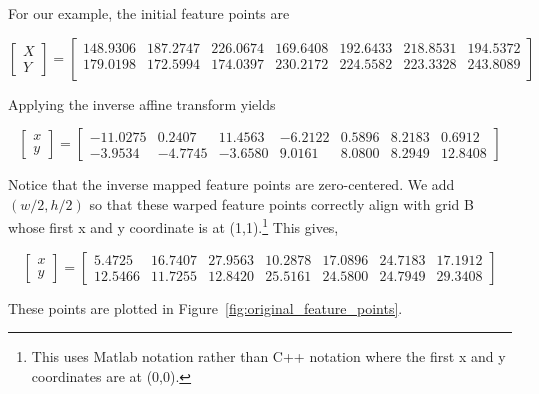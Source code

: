 For our example, the initial feature points are 

\begin{equation*}
\left[\begin{array}{ccc}
X  
\\ 
Y
\end{array}
\right]=
\left[
\begin{array}{cccccccc}
148.9306 & 187.2747 & 226.0674 & 169.6408 & 192.6433 & 218.8531 & 194.5372\\
179.0198 & 172.5994 & 174.0397 & 230.2172 & 224.5582 & 223.3328 & 243.8089\\
\end{array}
\right]
\end{equation*}

Applying the inverse affine transform yields

\begin{equation*}
\left[\begin{array}{ccc}
x  
\\ 
y
\end{array}
\right]=
\left[
\begin{array}{rrrrrrrrrrr}
  -11.0275 &   0.2407 &  11.4563 &  -6.2122  &  0.5896 &   8.2183 &   0.6912\\
   -3.9534  & -4.7745  & -3.6580  &  9.0161  &  8.0800  &  8.2949  & 12.8408
\end{array}
\right]
\end{equation*}


Notice that the inverse mapped feature points are zero-centered.  We add $(w/2, h/2)$ so that these warped feature points correctly align with grid B whose first x and y coordinate is at (1,1).\footnote{This uses Matlab notation rather than C++ notation where the first x and y coordinates are at (0,0).}  This gives,

\begin{equation*}
\left[\begin{array}{ccc}
x  
\\ 
y
\end{array}
\right]=
\left[
\begin{array}{rrrrrrrrrrr}
   5.4725  & 16.7407 &  27.9563  & 10.2878  & 17.0896 &  24.7183  & 17.1912 \\
   12.5466 &  11.7255 &  12.8420 &   25.5161 &  24.5800  & 24.7949 &   29.3408
\end{array}
\right]
\end{equation*}

These points are plotted in Figure~\ref{fig:original_feature_points}.


